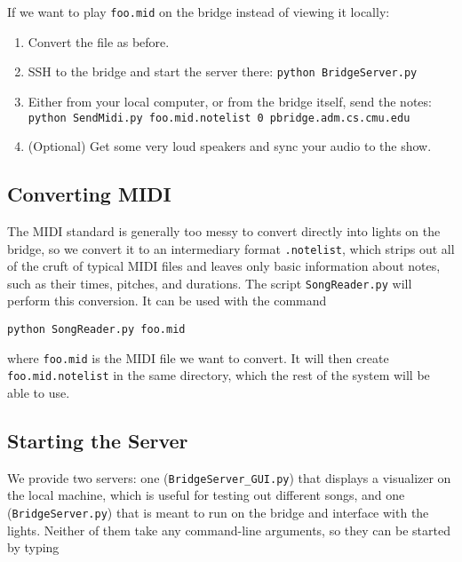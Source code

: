 \documentclass[11pt]{article}
\begin{document}
If we want to play \texttt{foo.mid} on the bridge instead of viewing
it locally:

\begin{enumerate}

\item Convert the file as before.

\item SSH to the bridge and start the server there: \texttt{python
  BridgeServer.py}

\item Either from your local computer, or from the bridge itself, send
  the notes: \texttt{python SendMidi.py foo.mid.notelist 0
    pbridge.adm.cs.cmu.edu}

\item (Optional) Get some very loud speakers and sync your audio to
  the show.

\end{enumerate}

\subsection{Converting MIDI}

The MIDI standard is generally too messy to convert directly into
lights on the bridge, so we convert it to an intermediary format
\texttt{.notelist}, which strips out all of the cruft of typical MIDI
files and leaves only basic information about notes, such as their
times, pitches, and durations. The script \texttt{SongReader.py} will
perform this conversion. It can be used with the command

\begin{center}
\texttt{python SongReader.py foo.mid}
\end{center}

where \texttt{foo.mid} is the MIDI file we want to convert. It will
then create \texttt{foo.mid.notelist} in the same directory, which the
rest of the system will be able to use.

\subsection{Starting the Server}

We provide two servers: one (\texttt{BridgeServer\_GUI.py}) that
displays a visualizer on the local machine, which is useful for
testing out different songs, and one (\texttt{BridgeServer.py}) that
is meant to run on the bridge and interface with the lights. Neither
of them take any command-line arguments, so they can be started by
typing
\end{document}
